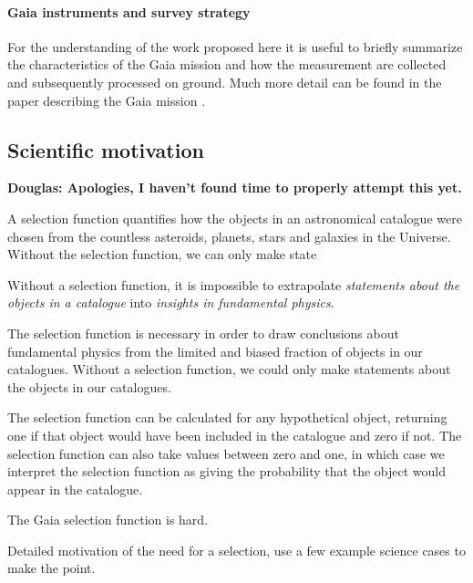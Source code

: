 \paragraph{Gaia instruments and survey strategy} For the understanding of the work proposed here it is useful to briefly summarize the characteristics of the Gaia mission and how the measurement are collected and subsequently processed on ground. Much more detail can be found in the paper describing the Gaia mission \cite{2016A&A...595A...1G}.

\subsection{Scientific motivation}
\label{sec:scientific-motivation}

\textbf{Douglas: Apologies, I haven't found time to properly attempt this yet.}

A selection function quantifies how the objects in an astronomical catalogue were chosen from the countless asteroids, planets, stars and galaxies in the Universe. Without the selection function, we can only make state

Without a selection function, it is impossible to extrapolate \textit{statements about the objects in a catalogue} into \textit{insights in fundamental physics}. 

The selection function is necessary in order to draw conclusions about fundamental physics from the limited and biased fraction of objects in our catalogues. Without a selection function, we could only make statements about the objects in our catalogues.

The selection function can be calculated for any hypothetical object, returning one if that object would have been included in the catalogue and zero if not. The selection function can also take values between zero and one, in which case we interpret the selection function as giving the probability that the object would appear in the catalogue.

The Gaia selection function is hard.



Detailed motivation of the need for a selection, use a few example science cases to make the point.

